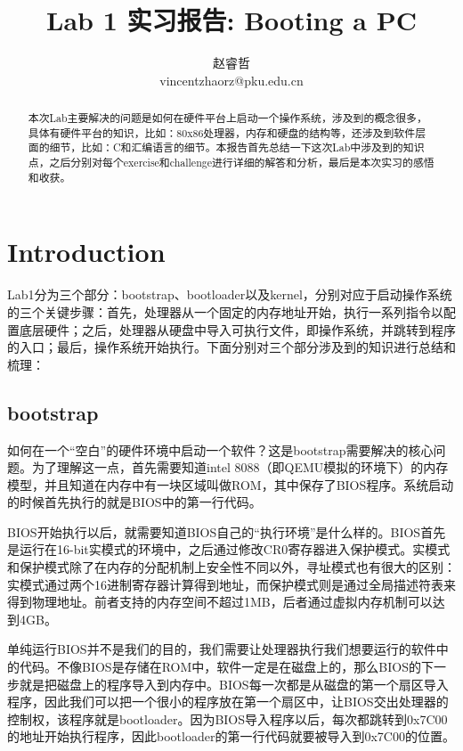 \documentclass[a4paper,12pt]{article}
\begin{document}
\title{Lab 1 实习报告: Booting a PC}
\author{赵睿哲\\
		vincentzhaorz@pku.edu.cn}
\date{}
\maketitle

\begin{abstract}
本次Lab主要解决的问题是如何在硬件平台上启动一个操作系统，涉及到的概念很多，具体有硬件平台的知识，比如：80x86处理器，内存和硬盘的结构等，还涉及到软件层面的细节，比如：C和汇编语言的细节。本报告首先总结一下这次Lab中涉及到的知识点，之后分别对每个exercise和challenge进行详细的解答和分析，最后是本次实习的感悟和收获。
\end{abstract}

\section{Introduction}

Lab1分为三个部分：bootstrap、bootloader以及kernel，分别对应于启动操作系统的三个关键步骤：首先，处理器从一个固定的内存地址开始，执行一系列指令以配置底层硬件；之后，处理器从硬盘中导入可执行文件，即操作系统，并跳转到程序的入口；最后，操作系统开始执行。下面分别对三个部分涉及到的知识进行总结和梳理：

\subsection{bootstrap}

如何在一个“空白”的硬件环境中启动一个软件？这是bootstrap需要解决的核心问题。为了理解这一点，首先需要知道intel 8088（即QEMU模拟的环境下）的内存模型，并且知道在内存中有一块区域叫做ROM，其中保存了BIOS程序。系统启动的时候首先执行的就是BIOS中的第一行代码。

BIOS开始执行以后，就需要知道BIOS自己的“执行环境”是什么样的。BIOS首先是运行在16-bit实模式的环境中，之后通过修改CR0寄存器进入保护模式。实模式和保护模式除了在内存的分配机制上安全性不同以外，寻址模式也有很大的区别：实模式通过两个16进制寄存器计算得到地址，而保护模式则是通过全局描述符表来得到物理地址。前者支持的内存空间不超过1MB，后者通过虚拟内存机制可以达到4GB。

单纯运行BIOS并不是我们的目的，我们需要让处理器执行我们想要运行的软件中的代码。不像BIOS是存储在ROM中，软件一定是在磁盘上的，那么BIOS的下一步就是把磁盘上的程序导入到内存中。BIOS每一次都是从磁盘的第一个扇区导入程序，因此我们可以把一个很小的程序放在第一个扇区中，让BIOS交出处理器的控制权，该程序就是bootloader。因为BIOS导入程序以后，每次都跳转到0x7C00的地址开始执行程序，因此bootloader的第一行代码就要被导入到0x7C00的位置。
\end{document}
